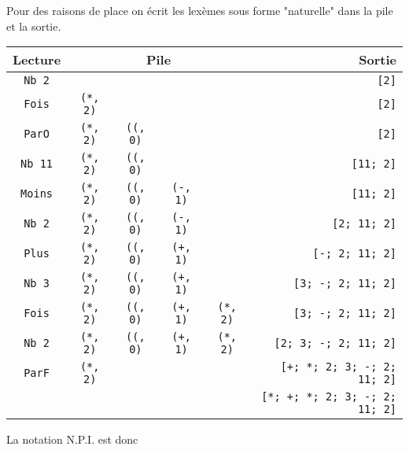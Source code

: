Pour des raisons de place on écrit les lexèmes sous forme "naturelle" dans la pile et la sortie.
\begin{center}
\begin{tabular}{|c|cccc|r|}
Lecture&\multicolumn{4}{c}{Pile}&Sortie\\
\hline
\texttt{Nb 2} &&&&&\texttt{[2]}\\
\texttt{Fois}&\texttt{(*, 2)}&&&&\texttt{[2]}\\
\texttt{ParO}&\texttt{(*, 2)}&\texttt{((, 0)}&&&\texttt{[2]}\\
\texttt{Nb 11}&\texttt{(*, 2)}&\texttt{((, 0)}&&&\texttt{[11; 2]}\\
\texttt{Moins}&\texttt{(*, 2)}&\texttt{((, 0)}&\texttt{(-, 1)}&&\texttt{[11; 2]}\\
\texttt{Nb 2}&\texttt{(*, 2)}&\texttt{((, 0)}&\texttt{(-, 1)}&&\texttt{[2; 11; 2]}\\
\texttt{Plus}&\texttt{(*, 2)}&\texttt{((, 0)}&\texttt{(+, 1)}&&\texttt{[-; 2; 11; 2]}\\
\texttt{Nb 3}&\texttt{(*, 2)}&\texttt{((, 0)}&\texttt{(+, 1)}&&\texttt{[3; -; 2; 11; 2]}\\
\texttt{Fois}&\texttt{(*, 2)}&\texttt{((, 0)}&\texttt{(+, 1)}&\texttt{(*, 2)}&\texttt{[3; -; 2; 11; 2]}\\
\texttt{Nb 2}&\texttt{(*, 2)}&\texttt{((, 0)}&\texttt{(+, 1)}&\texttt{(*, 2)}&\texttt{[2; 3; -; 2; 11; 2]}\\
\texttt{ParF}&\texttt{(*, 2)}&&&&\texttt{[+; *; 2; 3; -; 2; 11; 2]}\\
\hline
&&&&&\texttt{[*; +; *; 2; 3; -; 2; 11; 2]}\\
\hline
\end{tabular}
\end{center}
La notation N.P.I. est donc 
\begin{ocaml}
\end{ocaml}
